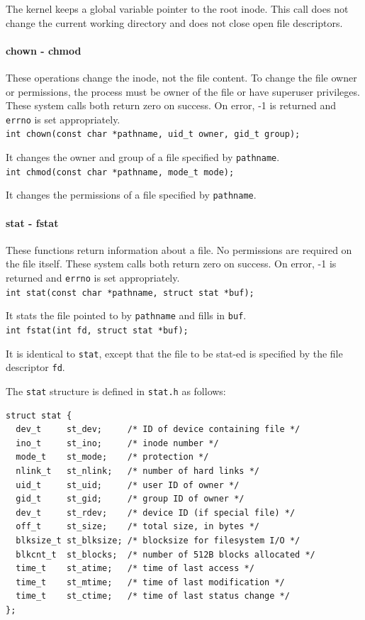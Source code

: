 The kernel keeps a global variable pointer to the root inode. This call does not change the current working directory and does not close open file descriptors.

\paragraph{chown - chmod}
These operations change the inode, not the file content. To change the file owner or permissions, the process must be owner of the file or have superuser privileges. These system calls both return zero on success. On error, -1 is returned and \texttt{errno} is set appropriately.
\\
\texttt{int chown(const char *pathname, uid\_t owner, gid\_t group);}

It changes the owner and group of a file specified by \texttt{pathname}.
\\
\texttt{int chmod(const char *pathname, mode\_t mode);}

It changes the permissions of a file specified by \texttt{pathname}.

\paragraph{stat - fstat}
These functions return information about a file. No permissions are required on the file itself. These system calls both return zero on success. On error, -1 is returned and \texttt{errno} is set appropriately.
\\
\texttt{int stat(const char *pathname, struct stat *buf);}

It stats the file pointed to by \texttt{pathname} and fills in \texttt{buf}.
\\
\texttt{int fstat(int fd, struct stat *buf);}

It is identical to \texttt{stat}, except that the file to be stat-ed is specified by the file descriptor \texttt{fd}.

The \texttt{stat} structure is defined in \texttt{stat.h} as follows:
\begin{verbatim}
struct stat {
  dev_t     st_dev;     /* ID of device containing file */
  ino_t     st_ino;     /* inode number */
  mode_t    st_mode;    /* protection */
  nlink_t   st_nlink;   /* number of hard links */
  uid_t     st_uid;     /* user ID of owner */
  gid_t     st_gid;     /* group ID of owner */
  dev_t     st_rdev;    /* device ID (if special file) */
  off_t     st_size;    /* total size, in bytes */
  blksize_t st_blksize; /* blocksize for filesystem I/O */
  blkcnt_t  st_blocks;  /* number of 512B blocks allocated */
  time_t    st_atime;   /* time of last access */
  time_t    st_mtime;   /* time of last modification */
  time_t    st_ctime;   /* time of last status change */
};
\end{verbatim}

